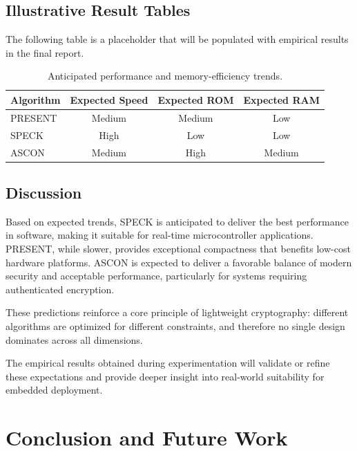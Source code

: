 \documentclass[12pt]{report}
\begin{document}
\section{Illustrative Result Tables}

The following table is a placeholder that will be populated with empirical results in the final report.

\begin{table}[H]
    \centering
    \begin{tabular}{lccc}
        \hline
        \textbf{Algorithm} & \textbf{Expected Speed} & \textbf{Expected ROM} & \textbf{Expected RAM} \\
        \hline
        PRESENT            & Medium                  & Medium                & Low                   \\
        SPECK              & High                    & Low                   & Low                   \\
        ASCON              & Medium                  & High                  & Medium                \\
        \hline
    \end{tabular}
    \caption{Anticipated performance and memory-efficiency trends.}
    \label{tab:expected-trends}
\end{table}

\section{Discussion}

Based on expected trends, SPECK is anticipated to deliver the best performance in software, making it suitable for real-time microcontroller applications. PRESENT, while slower, provides exceptional compactness that benefits low-cost hardware platforms. ASCON is expected to deliver a favorable balance of modern security and acceptable performance, particularly for systems requiring authenticated encryption.

These predictions reinforce a core principle of lightweight cryptography: different algorithms are optimized for different constraints, and therefore no single design dominates across all dimensions.

The empirical results obtained during experimentation will validate or refine these expectations and provide deeper insight into real-world suitability for embedded deployment.

\chapter{Conclusion and Future Work}
\end{document}
